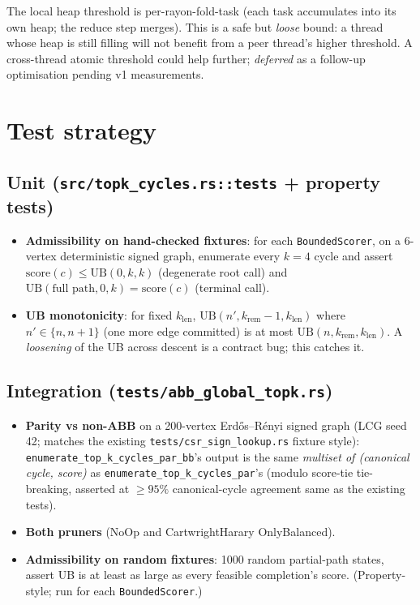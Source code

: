 \documentclass[a4paper,11pt]{article}
\begin{document}
The local heap threshold is per-rayon-fold-task (each task accumulates
into its own heap; the reduce step merges). This is a safe but
\emph{loose} bound: a thread whose heap is still filling will not
benefit from a peer thread's higher threshold. A cross-thread atomic
threshold could help further; \emph{deferred} as a follow-up
optimisation pending v1 measurements.

\section*{Test strategy}

\subsection*{Unit (\texttt{src/topk\_cycles.rs::tests} + property tests)}

\begin{itemize}
  \item \textbf{Admissibility on hand-checked fixtures}: for each
    \texttt{BoundedScorer}, on a 6-vertex deterministic signed graph,
    enumerate every $k{=}4$ cycle and assert
    $\mathrm{score}(c) \le \mathrm{UB}(0, k, k)$ (degenerate root call)
    and $\mathrm{UB}(\text{full path}, 0, k) = \mathrm{score}(c)$
    (terminal call).
  \item \textbf{UB monotonicity}: for fixed $k_{\mathrm{len}}$,
    $\mathrm{UB}(n', k_{\mathrm{rem}} - 1, k_{\mathrm{len}})$ where
    $n' \in \{n, n+1\}$ (one more edge committed) is at most
    $\mathrm{UB}(n, k_{\mathrm{rem}}, k_{\mathrm{len}})$. A
    \emph{loosening} of the UB across descent is a contract bug; this
    catches it.
\end{itemize}

\subsection*{Integration (\texttt{tests/abb\_global\_topk.rs})}

\begin{itemize}
  \item \textbf{Parity vs non-ABB} on a 200-vertex Erd\H{o}s--R\'enyi
    signed graph (LCG seed 42; matches the existing
    \texttt{tests/csr\_sign\_lookup.rs} fixture style):
    \texttt{enumerate\_top\_k\_cycles\_par\_bb}'s output is the same
    \emph{multiset of (canonical cycle, score)} as
    \texttt{enumerate\_top\_k\_cycles\_par}'s (modulo score-tie
    tie-breaking, asserted at $\ge 95\%$ canonical-cycle agreement
    same as the existing tests).
  \item \textbf{Both pruners} (NoOp and CartwrightHarary OnlyBalanced).
  \item \textbf{Admissibility on random fixtures}: 1000 random
    partial-path states, assert UB is at least as large as every
    feasible completion's score. (Property-style; run for each
    \texttt{BoundedScorer}.)
\end{itemize}
\end{document}
